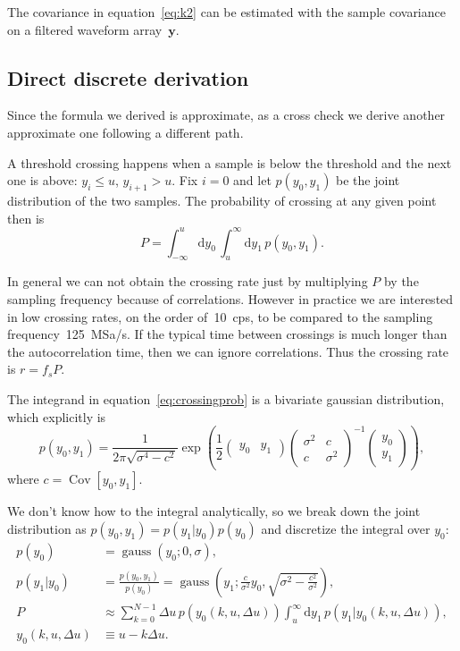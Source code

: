 The covariance in equation~\ref{eq:k2} can be estimated with the sample
covariance on a filtered waveform array~$\mathbf y$.

\subsection{Direct discrete derivation}

Since the formula we derived is approximate, as a cross check we derive another
approximate one following a different path.

A threshold crossing happens when a sample is below the threshold and the next
one is above: $y_i \leq u$, $y_{i+1} > u$. Fix $i=0$ and let $p(y_0,y_1)$ be the
joint distribution of the two samples. The probability of crossing at any given
point then is
%
\begin{equation}
    P =
    \int_{-\infty}^u \mathrm d y_0\,
    \int_u^\infty \mathrm d y_1\,
    p(y_0, y_1).
    \label{eq:crossingprob}
\end{equation}

In general we can not obtain the crossing rate just by multiplying $P$ by the
sampling frequency because of correlations. However in practice we are
interested in low crossing rates, on the order of~\SI{10}{cps}, to be compared
to the sampling frequency~\SI{125}{MSa/s}. If the typical time between
crossings is much longer than the autocorrelation time, then we can ignore
correlations. Thus the crossing rate is $r = f_s P$.

The integrand in equation~\ref{eq:crossingprob} is a bivariate gaussian
distribution, which explicitly is
%
\begin{equation}
    p(y_0,y_1) =
    \frac 1 {2\pi \sqrt{\sigma^4 - c^2}}
    \exp \left(
    \frac 1 2
    \begin{pmatrix}
        y_0 & y_1
    \end{pmatrix}
    \begin{pmatrix}
        \sigma^2 & c \\
        c & \sigma^2
    \end{pmatrix}^{-1}
    \begin{pmatrix}
        y_0 \\ y_1
    \end{pmatrix}
    \right),
\end{equation}
%
where $c = \operatorname{Cov}[y_0, y_1]$.

We don't know how to the integral analytically, so we break down the joint
distribution as $p(y_0,y_1) = p(y_1|y_0) p(y_0)$ and discretize the integral
over $y_0$:
%
\begin{align}
    p(y_0) &= \operatorname{gauss}(y_0; 0, \sigma), \\
    p(y_1|y_0) &= \frac {p(y_0, y_1)} {p(y_0)}
    = \operatorname{gauss} \left(
        y_1; \frac c {\sigma^2} y_0, \sqrt{\sigma^2 - \frac {c^2} {\sigma^2}}
    \right), \\
    P &\approx
    \sum_{k=0}^{N-1} \Delta u\, p(y_0(k,u,\Delta u))
    \int_u^\infty \mathrm d y_1\, p(y_1|y_0(k,u,\Delta u)), \label{eq:rdisc} \\
    y_0(k,u,\Delta u) &\equiv u - k \Delta u.
\end{align}

